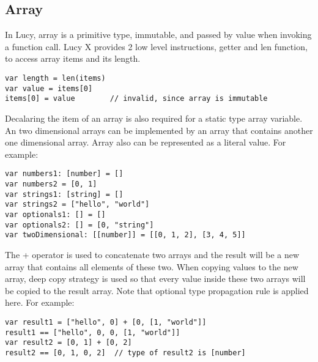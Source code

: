\subsection{Array}
In Lucy, array is a primitive type, immutable, and passed by value when invoking a function call. Lucy X provides 2 low level instructions, getter and len function, to access array items and its length.
\begin{lstlisting}
var length = len(items)
var value = items[0]
items[0] = value        // invalid, since array is immutable
\end{lstlisting}
Decalaring the item of an array is also required for a static type array variable. An two dimensional arrays can be implemented by an array that contains another one dimensional array. Array also can be represented as a literal value. For example:
\begin{lstlisting}
var numbers1: [number] = []
var numbers2 = [0, 1]
var strings1: [string] = []
var strings2 = ["hello", "world"]
var optionals1: [] = []
var optionals2: [] = [0, "string"]
var twoDimensional: [[number]] = [[0, 1, 2], [3, 4, 5]]
\end{lstlisting}
The + operator is used to concatenate two arrays and the result will be a new array that contains all elements of these two. When copying values to the new array, deep copy strategy is used so that every value inside these two arrays will be copied to the result array. Note that optional type propagation rule is applied here. For example:
\begin{lstlisting}
var result1 = ["hello", 0] + [0, [1, "world"]]
result1 == ["hello", 0, 0, [1, "world"]]
var result2 = [0, 1] + [0, 2]
result2 == [0, 1, 0, 2]  // type of result2 is [number]
\end{lstlisting}

